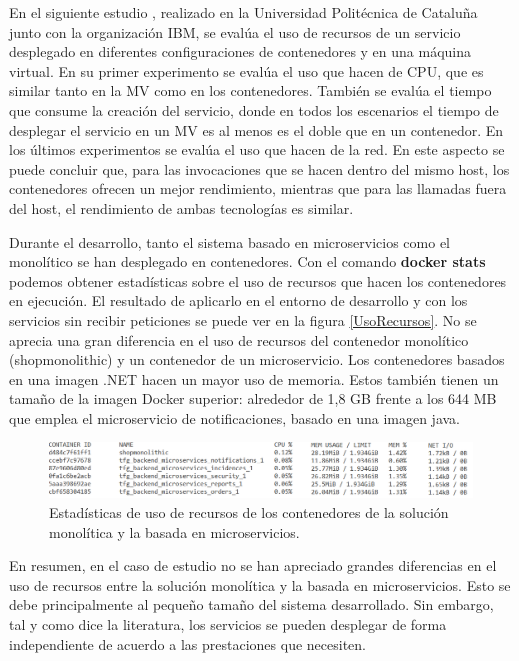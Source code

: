 \documentclass[11pt,spanish,listoffigures]{tfgetsinf}
\begin{document}
En el siguiente estudio \cite{Amaral2016}, realizado en la Universidad Politécnica de Cataluña junto con la organización IBM, se evalúa el uso de recursos de un servicio desplegado en diferentes configuraciones de contenedores y en una máquina virtual. En su primer experimento se evalúa el uso que hacen de CPU, que es similar tanto en la MV como en los contenedores. También se evalúa el tiempo que consume la creación del servicio, donde en todos los escenarios el tiempo de desplegar el servicio en un MV es al menos es el doble que en un contenedor. En los últimos experimentos se evalúa el uso que hacen de la red. En este aspecto se puede concluir que, para las invocaciones que se hacen dentro del mismo host, los contenedores ofrecen un mejor rendimiento, mientras que para las llamadas fuera del host, el rendimiento de ambas tecnologías es similar.

Durante el desarrollo, tanto el sistema basado en microservicios como el monolítico se han desplegado en contenedores. Con el comando \textbf{docker stats} podemos obtener estadísticas sobre el uso de recursos que hacen los contenedores en ejecución. El resultado de aplicarlo en el entorno de desarrollo y con los servicios sin recibir peticiones se puede ver en la figura \ref{UsoRecursos}. No se aprecia una gran diferencia en el uso de recursos del contenedor monolítico (shopmonolithic) y un contenedor de un microservicio. Los contenedores basados en una imagen .NET hacen un mayor uso de memoria. Estos también tienen un tamaño de la imagen Docker superior: alrededor de 1,8 GB frente a los 644 MB que emplea el microservicio de notificaciones, basado en una imagen java.

\begin{figure}[h]
\centering
\includegraphics[scale=0.65]{useMemory}
\caption{Estadísticas de uso de recursos de los contenedores de la solución monolítica y la basada en microservicios.}
\label{fig:UsoRecursos}
\end{figure}

En resumen, en el caso de estudio no se han apreciado grandes diferencias en el uso de recursos entre la solución monolítica y la basada en microservicios. Esto se debe principalmente al pequeño tamaño del sistema desarrollado. Sin embargo, tal y como dice la literatura, los servicios se pueden desplegar de forma independiente de acuerdo a las prestaciones que necesiten.
\end{document}
